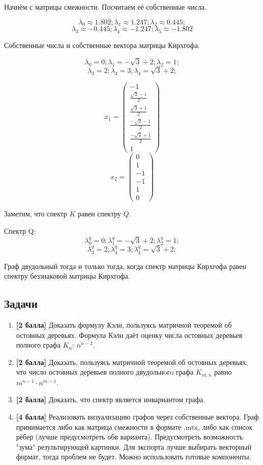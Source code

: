 \begin{example}
Начнём с матрицы смежности. Посчитаем её собственные числа.

$$\lambda_0 \approx 1.802; \lambda_1 \approx 1.247 ; \lambda_2 \approx 0.445; $$
$$\lambda_3 \approx -0.445; \lambda_4 \approx -1.247; \lambda_5 \approx -1.802$$

Собственные числа и собственные вектора матрицы Кирхгофа.

$$\lambda_0 =0; \lambda_1 = -\sqrt{3} + 2; \lambda_2 = 1; $$
$$\lambda_3 = 2; \lambda_4 = 3; \lambda_4 = \sqrt{3} + 2; $$


$$x_1 = \left(\begin{array}{c}-1 \\ \frac{\sqrt{3}-1}{2} \\ \frac{\sqrt{3}+1}{2} \\ \frac{-\sqrt{3}-1}{2} \\ \frac{-\sqrt{3}+1}{2} \\ 1 \end{array}\right)$$
$$x_2 = \left(\begin{array}{c}0\\1\\-1\\-1\\1\\0\end{array}\right)$$


Заметим, что спектр $K$ равен спектру $Q$.

Спектр Q:
$$\lambda^q_0 =0; \lambda^q_1 = -\sqrt{3} + 2; \lambda^q_2 = 1; $$
$$\lambda^q_3 = 2; \lambda^q_4 = 3; \lambda^q_4 = \sqrt{3} + 2; $$


\end{example}


\begin{theorem}
Граф двудольный тогда и только тогда, когда спектр матрицы Кирхгофа равен спектру беззнаковой матрицы Кирхгофа.
\end{theorem}

\subsection{Задачи}
\begin{enumerate}
\item \textbf{[2 балла]} Доказать формулу Кэли, пользуясь матричной теоремой об остовных деревьях. Формула Кэли даёт оценку числа остовных деревьев полного графа $K_{n}$: $n^{n-2}$.
\item \textbf{[2 балла]} Доказать, пользуясь матричной теоремой об остовных деревьях, что число остовных деревьев полного двудольнoгo графа $K_{m,n}$ равно $m^{n-1}\cdot n^{m-1}$.
\item \textbf{[2 балла]} Доказать, что спектр является инвариантом графа.
\item \textbf{[4 балла]} Реализовать визуализацию графов через собственные вектора. Граф принимается либо как матрица смежности в формате .mtx, либо как список рёбер (лучше предусмотреть обв варианта). Предусмотреть возможность "зума" результирующей картинки. Для экспорта лучше выбирать векторный формат, тогда проблем не будет. Можно использовать готовые компоненты.
\end{enumerate}